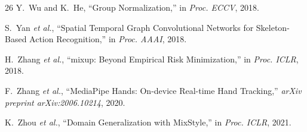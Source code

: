 \documentclass[conference]{IEEEtran}
\begin{document}
\begin{thebibliography}{26}
Y.~Wu and K.~He, ``Group Normalization,'' in \textit{Proc. ECCV}, 2018.

S.~Yan \textit{et al.}, ``Spatial Temporal Graph Convolutional Networks for Skeleton-Based Action Recognition,'' in \textit{Proc. AAAI}, 2018.

H.~Zhang \textit{et al.}, ``mixup: Beyond Empirical Risk Minimization,'' in \textit{Proc. ICLR}, 2018.

F.~Zhang \textit{et al.}, ``MediaPipe Hands: On-device Real-time Hand Tracking,'' \textit{arXiv preprint arXiv:2006.10214}, 2020.

K.~Zhou \textit{et al.}, ``Domain Generalization with MixStyle,'' in \textit{Proc. ICLR}, 2021.

\end{thebibliography}
\end{document}
